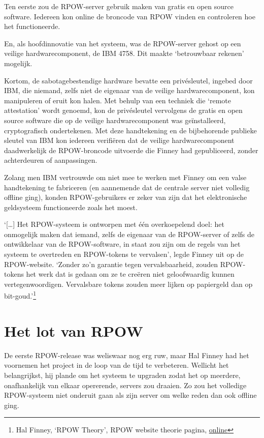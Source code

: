 \documentclass[
  a5paper,
  smalldemyvopaper,11pt,twoside,onecolumn,openright,extrafontsizes]{memoir}
\begin{document}
Ten eerste zou de RPOW-server gebruik maken van gratis en open source
software. Iedereen kon online de broncode van RPOW vinden en controleren
hoe het functioneerde.

En, als hoofdinnovatie van het systeem, was de RPOW-server gehost op een
veilige hardwarecomponent, de IBM 4758. Dit maakte `betrouwbaar rekenen'
mogelijk.

Kortom, de sabotagebestendige hardware bevatte een privésleutel, ingebed
door IBM, die niemand, zelfs niet de eigenaar van de veilige
hardwarecomponent, kon manipuleren of eruit kon halen. Met behulp van
een techniek die `remote attestation' wordt genoemd, kon de privésleutel
vervolgens de gratis en open source software die op de veilige
hardwarecomponent was geïnstalleerd, cryptografisch ondertekenen. Met
deze handtekening en de bijbehorende publieke sleutel van IBM kon
iedereen verifiëren dat de veilige hardwarecomponent daadwerkelijk de
RPOW-broncode uitvoerde die Finney had gepubliceerd, zonder achterdeuren
of aanpassingen.

Zolang men IBM vertrouwde om niet mee te werken met Finney om een valse
handtekening te fabriceren (en aannemende dat de centrale server niet
volledig offline ging), konden RPOW-gebruikers er zeker van zijn dat het
elektronische geldsysteem functioneerde zoals het moest.

`{[}\ldots{]} Het RPOW-systeem is ontworpen met één overkoepelend doel:
het onmogelijk maken dat iemand, zelfs de eigenaar van de RPOW-server of
zelfs de ontwikkelaar van de RPOW-software, in staat zou zijn om de
regels van het systeem te overtreden en RPOW-tokens te vervalsen', legde
Finney uit op de RPOW-website. `Zonder zo'n garantie tegen
vervalsbaarheid, zouden RPOW-tokens het werk dat is gedaan om ze te
creëren niet geloofwaardig kunnen vertegenwoordigen. Vervalsbare tokens
zouden meer lijken op papiergeld dan op bit-goud.'\footnote{Hal Finney,
  `RPOW Theory', RPOW website theorie pagina,
  \href{https://web.archive.org/web/20040815154951/http://rpow.net/theory.html}{online}}

\section{Het lot van RPOW}\label{het-lot-van-rpow}

De eerste RPOW-release was weliswaar nog erg ruw, maar Hal Finney had
het voornemen het project in de loop van de tijd te verbeteren. Wellicht
het belangrijkst, hij plande om het systeem te upgraden zodat het op
meerdere, onafhankelijk van elkaar opererende, servers zou draaien. Zo
zou het volledige RPOW-systeem niet onderuit gaan als zijn server om
welke reden dan ook offline ging.
\end{document}
